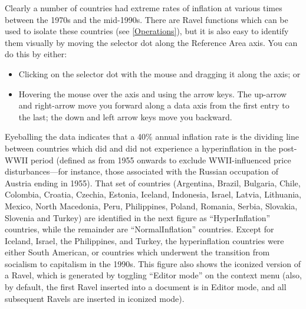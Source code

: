 Clearly a number of countries had extreme rates of inflation at various
times between the 1970s and the mid-1990s. There are Ravel functions
which can be used to isolate these countries (see \ref{Operations}),
but it is also easy to identify them visually by moving the selector
dot along the Reference Area axis. You can do this by either:
\begin{itemize}
\item Clicking on the selector dot with the mouse and dragging it along
the axis; or
\item Hovering the mouse over the axis and using the arrow keys. The up-arrow
and right-arrow move you forward along a data axis from the first
entry to the last; the down and left arrow keys move you backward.
\end{itemize}
Eyeballing the data indicates that a 40\% annual inflation rate is
the dividing line between countries which did and did not experience
a hyperinflation in the post-WWII period (defined as from 1955 onwards
to exclude WWII-influenced price disturbances---for instance, those
associated with the Russian occupation of Austria ending in 1955).
That set of countries (Argentina, Brazil, Bulgaria, Chile, Colombia,
Croatia, Czechia, Estonia, Iceland, Indonesia, Israel, Latvia, Lithuania,
Mexico, North Macedonia, Peru, Philippines, Poland, Romania, Serbia,
Slovakia, Slovenia and Turkey) are identified in the next figure as
``HyperInflation'' countries, while the remainder are ``NormalInflation''
countries. Except for Iceland, Israel, the Philippines, and Turkey,
the hyperinflation countries were either South American, or countries
which underwent the transition from socialism to capitalism in the
1990s. This figure also shows the iconized version of a Ravel, which
is generated by toggling ``Editor mode'' on the context menu (also,
by default, the first Ravel inserted into a document is in Editor
mode, and all subsequent Ravels are inserted in iconized mode).

